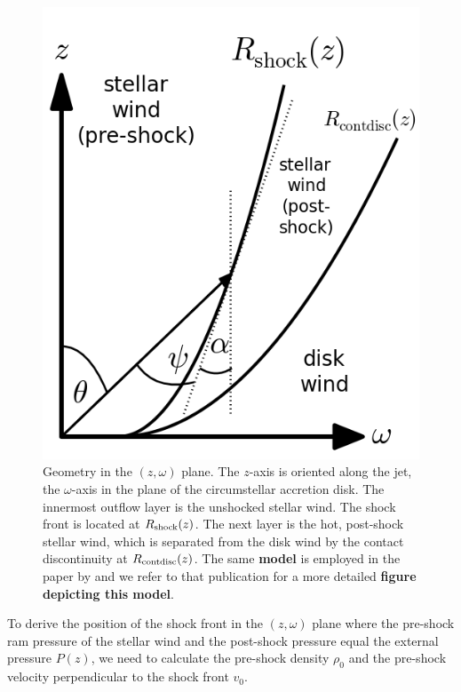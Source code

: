 \documentclass[manuscript]{aastex}
\begin{document}
\begin{figure}[h!]
\begin{center}
\includegraphics[width=0.35\columnwidth]{figures/sketch/sketch.png}
\caption{\label{fig:sketch}
Geometry in the $(z, \omega)$ plane. The $z$-axis is oriented along the jet, the $\omega$-axis in the plane of the circumstellar accretion disk. The innermost outflow layer is the unshocked stellar wind. The shock front is located at $R_{\rm{shock}}(z)$. The next layer is the hot, post-shock stellar wind, which is separated from the disk wind by the contact discontinuity at $R_{\rm{contdisc}}(z)$. The same \textbf{model} is employed in the paper by \citet{2012MNRAS.422.2282K} and we refer to that publication for a more detailed \textbf{figure depicting this model}.}
\end{center}
\end{figure}

To derive the position of the shock front in the $(z, \omega)$ plane where the pre-shock ram pressure of the stellar wind and the post-shock pressure equal the external pressure $P(z)$, we need to calculate the pre-shock density $\rho_0$ and the pre-shock velocity perpendicular to the shock front $v_0$.
\end{document}
